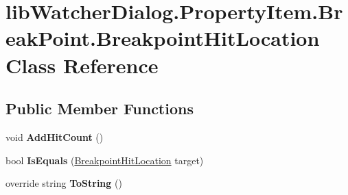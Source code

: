 \hypertarget{classlib_watcher_dialog_1_1_property_item_1_1_break_point_1_1_breakpoint_hit_location}{\section{lib\+Watcher\+Dialog.\+Property\+Item.\+Break\+Point.\+Breakpoint\+Hit\+Location Class Reference}
\label{classlib_watcher_dialog_1_1_property_item_1_1_break_point_1_1_breakpoint_hit_location}
}
\subsection*{Public Member Functions}
\begin{DoxyCompactItemize}
\item 
\hypertarget{classlib_watcher_dialog_1_1_property_item_1_1_break_point_1_1_breakpoint_hit_location_a488583e55174034aad84c6ce5529bdb7}{void {\bfseries Add\+Hit\+Count} ()}\label{classlib_watcher_dialog_1_1_property_item_1_1_break_point_1_1_breakpoint_hit_location_a488583e55174034aad84c6ce5529bdb7}

\item 
\hypertarget{classlib_watcher_dialog_1_1_property_item_1_1_break_point_1_1_breakpoint_hit_location_a57056b17dd05f1cf4f14e600684ff974}{bool {\bfseries Is\+Equals} (\hyperlink{classlib_watcher_dialog_1_1_property_item_1_1_break_point_1_1_breakpoint_hit_location}{Breakpoint\+Hit\+Location} target)}\label{classlib_watcher_dialog_1_1_property_item_1_1_break_point_1_1_breakpoint_hit_location_a57056b17dd05f1cf4f14e600684ff974}

\item 
\hypertarget{classlib_watcher_dialog_1_1_property_item_1_1_break_point_1_1_breakpoint_hit_location_ae848756fb02f2475a59d2e0a285db0a0}{override string {\bfseries To\+String} ()}\label{classlib_watcher_dialog_1_1_property_item_1_1_break_point_1_1_breakpoint_hit_location_ae848756fb02f2475a59d2e0a285db0a0}

\end{DoxyCompactItemize}
